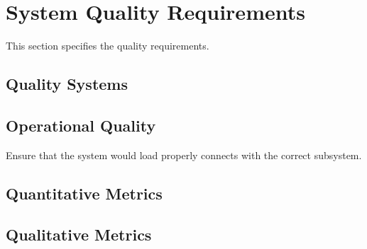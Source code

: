 \KNEADSECTIONNEWPAGE
\section{System Quality Requirements}
\label{lab:sec_Quality}



This section specifies the \ThisSys quality requirements.

\subsection{Quality Systems}
\label{lab:ssec_QualitySystems}



\subsection{Operational Quality}
\label{lab:ssec_OperationalQuality}

Ensure that the system would load properly connects with the correct subsystem.


\subsection{Quantitative Metrics}
\label{lab:ssec_QuantitativeMetrics}





\subsection{Qualitative Metrics}
\label{lab:ssec_QualitativeMetrics}



